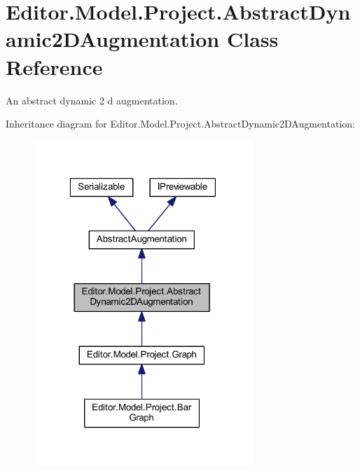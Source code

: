 \section{Editor.\-Model.\-Project.\-Abstract\-Dynamic2\-D\-Augmentation Class Reference}
\label{class_editor_1_1_model_1_1_project_1_1_abstract_dynamic2_d_augmentation}


An abstract dynamic 2 d augmentation.  




Inheritance diagram for Editor.\-Model.\-Project.\-Abstract\-Dynamic2\-D\-Augmentation\-:
\nopagebreak
\begin{figure}[H]
\begin{center}
\leavevmode
\includegraphics[width=235pt]{class_editor_1_1_model_1_1_project_1_1_abstract_dynamic2_d_augmentation__inherit__graph}
\end{center}
\end{figure}


